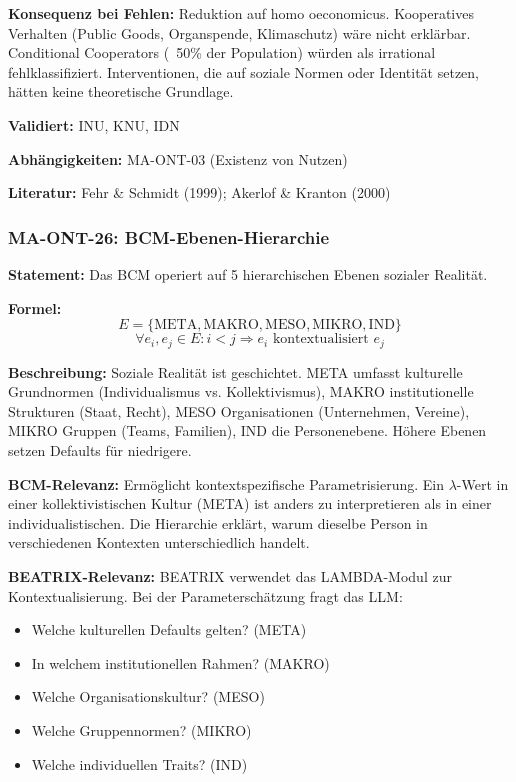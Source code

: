 \textbf{Konsequenz bei Fehlen:}
Reduktion auf homo oeconomicus. Kooperatives Verhalten (Public Goods, Organspende, Klimaschutz) wäre nicht erklärbar. Conditional Cooperators (~50\% der Population) würden als irrational fehlklassifiziert. Interventionen, die auf soziale Normen oder Identität setzen, hätten keine theoretische Grundlage.

\textbf{Validiert:} INU, KNU, IDN

\textbf{Abhängigkeiten:} MA-ONT-03 (Existenz von Nutzen)

\textbf{Literatur:} Fehr \& Schmidt (1999); Akerlof \& Kranton (2000)


\subsubsection*{MA-ONT-26: BCM-Ebenen-Hierarchie}

\textbf{Statement:} Das BCM operiert auf 5 hierarchischen Ebenen sozialer Realität.

\textbf{Formel:}
\begin{equation}
E = \{\text{META}, \text{MAKRO}, \text{MESO}, \text{MIKRO}, \text{IND}\}
\end{equation}
\begin{equation}
\forall e_i, e_j \in E: i < j \Rightarrow e_i \text{ kontextualisiert } e_j
\end{equation}

\textbf{Beschreibung:}
Soziale Realität ist geschichtet. META umfasst kulturelle Grundnormen (Individualismus vs. Kollektivismus), MAKRO institutionelle Strukturen (Staat, Recht), MESO Organisationen (Unternehmen, Vereine), MIKRO Gruppen (Teams, Familien), IND die Personenebene. Höhere Ebenen setzen Defaults für niedrigere.

\textbf{BCM-Relevanz:}
Ermöglicht kontextspezifische Parametrisierung. Ein $\lambda$-Wert in einer kollektivistischen Kultur (META) ist anders zu interpretieren als in einer individualistischen. Die Hierarchie erklärt, warum dieselbe Person in verschiedenen Kontexten unterschiedlich handelt.

\textbf{BEATRIX-Relevanz:}
BEATRIX verwendet das LAMBDA-Modul zur Kontextualisierung. Bei der Parameterschätzung fragt das LLM:
\begin{itemize}
    \item Welche kulturellen Defaults gelten? (META)
    \item In welchem institutionellen Rahmen? (MAKRO)
    \item Welche Organisationskultur? (MESO)
    \item Welche Gruppennormen? (MIKRO)
    \item Welche individuellen Traits? (IND)
\end{itemize}

